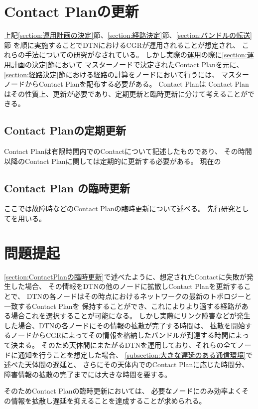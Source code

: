 \section{Contact Planの更新}
\label{section:ContactPlanの更新}

上記\ref{section:運用計画の決定}節、\ref{section:経路決定}節、\ref{section:バンドルの転送}節
を順に実施することでDTNにおけるCGRが運用されることが想定され、
これらの手法についての研究がなされている。
しかし実際の運用の際に\ref{section:運用計画の決定}節において
マスターノードで決定されたContact Planを元に、
\ref{section:経路決定}節における経路の計算をノードにおいて行うには、
マスターノードからContact Planを配布する必要がある。
Contact Planは
Contact Planはその性質上、更新が必要であり、定期更新と臨時更新に分けて考えることができる。

\subsection{Contact Planの定期更新}
\label{sec:ContactPlanの定期更新}
Contact Planは有限時間内でのContactについて記述したものであり、
その時間以降のContact Planに関しては定期的に更新する必要がある。
現在の

\subsection{Contact Plan の臨時更新}
\label{sec:ContactPlanの臨時更新}
ここでは故障時などのContact Planの臨時更新について述べる。
先行研究として\cite{Bezirgiannidis2013}を用いる。

\section{問題提起}
\label{sec:ContactPlanの臨時更新の課題}
\ref{section:ContactPlanの臨時更新}で述べたように、想定されたContactに失敗が発生した場合、
その情報をDTNの他のノードに拡散しContact Planを更新することで、
DTNの各ノードはその時点におけるネットワークの最新のトポロジーと一致するContact Planを
保持することができ、これによりより適する経路がある場合これを選択することが可能になる。
しかし実際にリンク障害などが発生した場合、DTNの各ノードにその情報の拡散が完了する時間は、
拡散を開始するノードからCGRによってその情報を格納したバンドルが到達する時間によって決まる。
そのため天体間にまたがるDTNを運用しており、それらの全てノードに通知を行うことを想定した場合、
\ref{subsection:大きな遅延のある通信環境}で述べた天体間の遅延と、
さらにその天体内でのContact Planに応じた時間分、障害情報の拡散の完了までには大きな時間を要する。

そのためContact Planの臨時更新においては、
必要なノードにのみ効率よくその情報を拡散し遅延を抑えることを達成することが求められる。